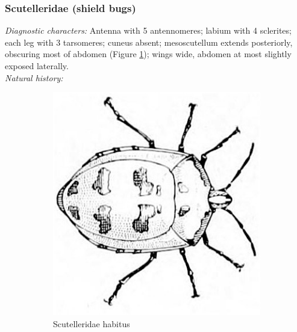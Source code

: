 \documentclass[letterpaper, 11pt]{article}
\begin{document}
\subsubsection{Scutelleridae (shield bugs)}
\noindent{}\textit{Diagnostic characters:} Antenna with 5 antennomeres; labium with 4 sclerites; each leg with 3 tarsomeres; cuneus absent; mesoscutellum extends posteriorly, obscuring most of abdomen (Figure \ref{fig:scutellerid1}); wings wide, abdomen at most slightly exposed laterally.\\

\noindent{}\textit{Natural history:} \\

\begin{figure}[ht!]
 \centering
\begin{subfigure}[ht!]{0.33\textwidth}
 \includegraphics[width=\textwidth]{ScutelleridHabitus}
 \caption{Scutelleridae habitus \citep[][Plate XXXI, Fig. 11]{bhl82061}}
 \label{fig:scutellerid1}
\end{subfigure}
 \qquad 
\begin{subfigure}[ht!]{0.4\textwidth}

\end{subfigure}
\end{figure}
\end{document}

